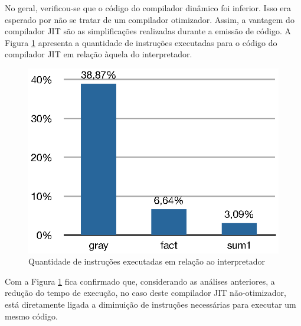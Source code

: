 No geral, verificou-se que o código do compilador dinâmico foi
inferior. Isso era esperado por não se tratar de um compilador otimizador.
Assim, a vantagem do compilador JIT são as simplificações realizadas
durante a emissão de código. A Figura \ref{fig:instrelative} apresenta
a quantidade de instruções executadas para o código do compilador JIT
em relação àquela do interpretador.

\begin{figure}[ht!]
  \centering
  \includegraphics[scale=0.70]{figs/instrelative}
  \caption{Quantidade de instruções executadas em relação ao
    interpretador\label{fig:instrelative}}
\end{figure}

Com a Figura \ref{fig:instrelative} fica confirmado que,
considerando as análises
anteriores, a redução do
tempo de execução, no caso deste compilador JIT não-otimizador, está
diretamente ligada a
diminuição de instruções necessárias para executar um mesmo
código.

